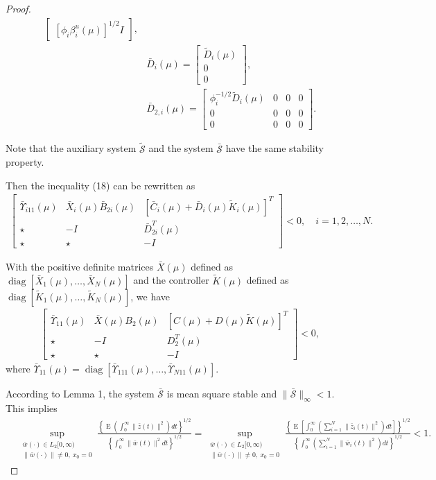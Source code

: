 \documentclass[11pt,draftcls,onecolumn]{IEEEtran}
\DeclareMathOperator{\diag}{diag}
\DeclareMathOperator{\E}{E}
\begin{document}
\begin{proof}
\begin{align*}
\begin{bmatrix}
 [\phi_i\beta_i^{u}(\mu)]^{1/2}I
\end{bmatrix},
\\
&\bar{D}_{i}(\mu)=
\begin{bmatrix}
\tilde{D}_i(\mu)\\
 0\\
 0
\end{bmatrix},\\
&\bar{D}_{2,i}(\mu)=
\begin{bmatrix}
\phi_i^{-1/2}\tilde{D}_i(\mu) &0 &0 &0 \\
 0 & 0 & 0& 0\\
 0 &0 &0 & 0
\end{bmatrix}.
 \end{align*}

 Note that the auxiliary system  $\tilde{\mathcal{S}}$ and the system $\bar{\mathcal{S}}$ have the same stability property.

 Then the inequality (18) can be rewritten as
 \begin{align*}
\begin{bmatrix}
   \bar{\Upsilon}_{i11}(\mu) & \bar{X}_i(\mu)\bar B_{2i}(\mu) & [\bar{C}_i(\mu)+\bar{D}_i(\mu)\tilde{K}_i(\mu)]^T\\
   \star & -I & \bar D_{2i}^T(\mu)\\
   \star   & \star & -I
  \end{bmatrix} <0,\quad i=1,2,\ldots,N.
\end{align*}

 With the positive definite matrices $\bar{X}(\mu)$ defined as $\diag[\bar{X}_1(\mu),\ldots,\bar{X}_N(\mu)]$ and the controller  $\tilde{K}(\mu)$ defined as $\diag[\tilde{K}_1(\mu),\ldots,\tilde{K}_N(\mu)]$, we have
\begin{align*}
\begin{bmatrix}
    \bar{\Upsilon}_{11}(\mu) & \bar{X}(\mu)B_2(\mu) & [C(\mu)+D(\mu)\tilde{K}(\mu)]^T\\
    \star & -I & D_2^T(\mu)\\
   \star & \star & -I
  \end{bmatrix} <0,
\end{align*}
where $\bar{\Upsilon}_{11}(\mu)=\diag[\bar{\Upsilon}_{111}(\mu),\ldots,\bar{\Upsilon}_{N11}(\mu)]$.

According to  Lemma 1, the system $\bar{\mathcal{S}}$ is mean square stable and $\|\bar{\mathcal{S}}\|_{\infty}<1$. This implies
\begin{align*}
&\sup_{\substack{  \bar{w}(\cdot)\in L_2[0,\infty)\\\|\bar{w}(\cdot)\|\neq 0,~ x_0=0}}\frac{\left\{\E(\int_0^{\infty}\|\bar{z}(t)\|^2)dt\right\}^{1/2}}{\left\{\int_0^{\infty}\|\bar{w}(t)\|^2dt\right\}^{1/2}} =
\sup_{\substack{  \bar{w}(\cdot)\in L_2[0,\infty)\\\|\bar{w}(\cdot)\|\neq 0,~ x_0=0}}\frac{\left\{\E\left[\int_0^{\infty}(\sum_{i=1}^N\|\bar{z}_i(t)\|^2)dt\right]\right\}^{1/2}}{\left\{\int_0^{\infty}(\sum_{i=1}^N\|\bar{w}_i(t)\|^2)dt\right\}^{1/2}}
<1.
\end{align*}


\end{proof}
\end{document}
